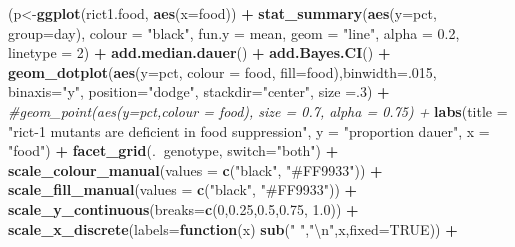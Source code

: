 \documentclass[]{article}
\newenvironment{Shaded}{\begin{snugshade}}{\end{snugshade}}
\newcommand{\KeywordTok}[1]{\textcolor[rgb]{0.13,0.29,0.53}{\textbf{#1}}}
\newcommand{\DataTypeTok}[1]{\textcolor[rgb]{0.13,0.29,0.53}{#1}}
\newcommand{\DecValTok}[1]{\textcolor[rgb]{0.00,0.00,0.81}{#1}}
\newcommand{\FloatTok}[1]{\textcolor[rgb]{0.00,0.00,0.81}{#1}}
\newcommand{\CharTok}[1]{\textcolor[rgb]{0.31,0.60,0.02}{#1}}
\newcommand{\StringTok}[1]{\textcolor[rgb]{0.31,0.60,0.02}{#1}}
\newcommand{\CommentTok}[1]{\textcolor[rgb]{0.56,0.35,0.01}{\textit{#1}}}
\newcommand{\OtherTok}[1]{\textcolor[rgb]{0.56,0.35,0.01}{#1}}
\newcommand{\ControlFlowTok}[1]{\textcolor[rgb]{0.13,0.29,0.53}{\textbf{#1}}}
\newcommand{\OperatorTok}[1]{\textcolor[rgb]{0.81,0.36,0.00}{\textbf{#1}}}
\newcommand{\NormalTok}[1]{#1}
\begin{document}
\begin{Shaded}
\begin{Highlighting}[]
{{\NormalTok{(p<-}\KeywordTok{ggplot}\NormalTok{(rict1.food, }\KeywordTok{aes}\NormalTok{(}\DataTypeTok{x=}\NormalTok{food)) }\OperatorTok{+}
\StringTok{  }\KeywordTok{stat_summary}\NormalTok{(}\KeywordTok{aes}\NormalTok{(}\DataTypeTok{y=}\NormalTok{pct, }\DataTypeTok{group=}\NormalTok{day), }\DataTypeTok{colour =} \StringTok{"black"}\NormalTok{, }\DataTypeTok{fun.y =}\NormalTok{ mean, }\DataTypeTok{geom =} \StringTok{"line"}\NormalTok{, }\DataTypeTok{alpha =} \FloatTok{0.2}\NormalTok{, }\DataTypeTok{linetype =} \DecValTok{2}\NormalTok{) }\OperatorTok{+}
\StringTok{  }\KeywordTok{add.median.dauer}\NormalTok{() }\OperatorTok{+}
\StringTok{  }\KeywordTok{add.Bayes.CI}\NormalTok{() }\OperatorTok{+}
\StringTok{  }\KeywordTok{geom_dotplot}\NormalTok{(}\KeywordTok{aes}\NormalTok{(}\DataTypeTok{y=}\NormalTok{pct, }\DataTypeTok{colour =}\NormalTok{ food, }\DataTypeTok{fill=}\NormalTok{food),}\DataTypeTok{binwidth=}\NormalTok{.}\DecValTok{015}\NormalTok{, }\DataTypeTok{binaxis=}\StringTok{"y"}\NormalTok{, }\DataTypeTok{position=}\StringTok{"dodge"}\NormalTok{, }\DataTypeTok{stackdir=}\StringTok{"center"}\NormalTok{, }\DataTypeTok{size =}\NormalTok{.}\DecValTok{3}\NormalTok{) }\OperatorTok{+}
\StringTok{    }\CommentTok{#geom_point(aes(y=pct,colour = food), size = 0.7, alpha = 0.75) +}
\StringTok{  }\KeywordTok{labs}\NormalTok{(}\DataTypeTok{title =} \StringTok{"rict-1 mutants are deficient in food suppression"}\NormalTok{,}
           \DataTypeTok{y =} \StringTok{"proportion dauer"}\NormalTok{,}
           \DataTypeTok{x =} \StringTok{"food"}\NormalTok{) }\OperatorTok{+}
\StringTok{  }\KeywordTok{facet_grid}\NormalTok{(.}\OperatorTok{~}\NormalTok{genotype, }\DataTypeTok{switch=}\StringTok{"both"}\NormalTok{) }\OperatorTok{+}
\StringTok{  }\KeywordTok{scale_colour_manual}\NormalTok{(}\DataTypeTok{values =} \KeywordTok{c}\NormalTok{(}\StringTok{"black"}\NormalTok{, }\StringTok{"#FF9933"}\NormalTok{)) }\OperatorTok{+}
\StringTok{    }\KeywordTok{scale_fill_manual}\NormalTok{(}\DataTypeTok{values =} \KeywordTok{c}\NormalTok{(}\StringTok{"black"}\NormalTok{, }\StringTok{"#FF9933"}\NormalTok{)) }\OperatorTok{+}
\StringTok{      }\KeywordTok{scale_y_continuous}\NormalTok{(}\DataTypeTok{breaks=}\KeywordTok{c}\NormalTok{(}\DecValTok{0}\NormalTok{,}\FloatTok{0.25}\NormalTok{,}\FloatTok{0.5}\NormalTok{,}\FloatTok{0.75}\NormalTok{, }\FloatTok{1.0}\NormalTok{)) }\OperatorTok{+}
\StringTok{      }\KeywordTok{scale_x_discrete}\NormalTok{(}\DataTypeTok{labels=}\ControlFlowTok{function}\NormalTok{(x) }\KeywordTok{sub}\NormalTok{(}\StringTok{" "}\NormalTok{,}\StringTok{"}\CharTok{\textbackslash{}n}\StringTok{"}\NormalTok{,x,}\DataTypeTok{fixed=}\OtherTok{TRUE}\NormalTok{)) }\OperatorTok{+}
}}
\end{Highlighting}
\end{Shaded}
\end{document}
